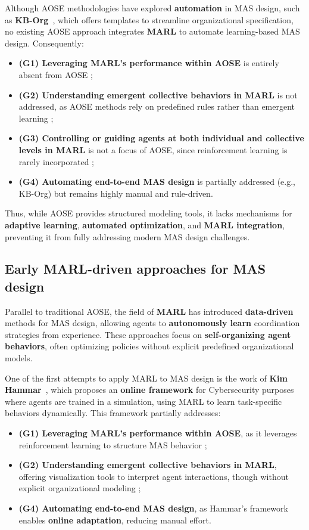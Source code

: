 \documentclass[pdflatex,sn-mathphys-num]{sn-jnl}%
\theoremstyle{thmstyleone}%
\theoremstyle{thmstyletwo}%
\theoremstyle{thmstylethree}%
\begin{document}
Although AOSE methodologies have explored \textbf{automation} in MAS design, such as \textbf{KB-Org}~\cite{kborg2001}, which offers templates to streamline organizational specification, no existing AOSE approach integrates \textbf{MARL} to automate learning-based MAS design. Consequently:
%
\begin{itemize}
    \item \textbf{(G1) Leveraging MARL's performance within AOSE} is entirely absent from AOSE ;
    \item \textbf{(G2) Understanding emergent collective behaviors in MARL} is not addressed, as AOSE methods rely on predefined rules rather than emergent learning ;
    \item \textbf{(G3) Controlling or guiding agents at both individual and collective levels in MARL} is not a focus of AOSE, since reinforcement learning is rarely incorporated ;
    \item \textbf{(G4) Automating end-to-end MAS design} is partially addressed (e.g., KB-Org) but remains highly manual and rule-driven.
\end{itemize}

Thus, while AOSE provides structured modeling tools, it lacks mechanisms for \textbf{adaptive learning}, \textbf{automated optimization}, and \textbf{MARL integration}, preventing it from fully addressing modern MAS design challenges.

\subsection{Early MARL-driven approaches for MAS design}\label{sub-sec:marl_rel}

Parallel to traditional AOSE, the field of \textbf{MARL} has introduced \textbf{data-driven} methods for MAS design, allowing agents to \textbf{autonomously learn} coordination strategies from experience. These approaches focus on \textbf{self-organizing agent behaviors}, often optimizing policies without explicit predefined organizational models.

One of the first attempts to apply MARL to MAS design is the work of \textbf{Kim Hammar}~\cite{hammar2019}, which proposes an \textbf{online framework} for Cybersecurity purposes where agents are trained in a simulation, using MARL to learn task-specific behaviors dynamically. This framework partially addresses:
%
\begin{itemize}
    \item \textbf{(G1) Leveraging MARL's performance within AOSE}, as it leverages reinforcement learning to structure MAS behavior ;
    \item \textbf{(G2) Understanding emergent collective behaviors in MARL}, offering visualization tools to interpret agent interactions, though without explicit organizational modeling ;
    \item \textbf{(G4) Automating end-to-end MAS design}, as Hammar's framework enables \textbf{online adaptation}, reducing manual effort.
\end{itemize}
\end{document}
